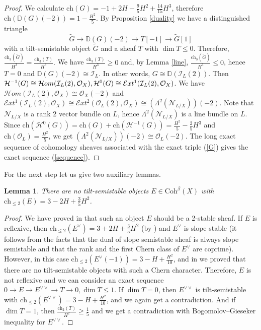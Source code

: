 \documentclass{amsart}
\newtheorem{lemma}[theorem]{Lemma}
\begin{document}
\begin{proof}
	We calculate $\mathrm{ch}(G)=-1+2H-\frac 95H^2+\frac{14}{15}H^3$, therefore $\mathrm{ch}(\mathbb D(G)(-2))=1-\frac{H^2}{5}$. By Proposition \ref{duality} we have a distinguished triangle
	$$\widetilde{G}\to \mathbb D(G)(-2)\to T[-1]\to \widetilde{G}[1]$$
	with a tilt-semistable object $\widetilde{G}$ and a sheaf $T$ with $\dim T\le 0$. Therefore, $\frac{\mathrm{ch}_3(\widetilde G)}{H^3}=\frac{\mathrm{ch}_3(T)}{H^3}.$ We have $\frac{\mathrm{ch}_3(T)}{H^3}\ge 0$ and, by Lemma \ref{line}, $\frac{\mathrm{ch}_3(\widetilde G)}{H^3}\le 0$, hence $T=0$ and $\mathbb D(G)(-2)\cong\mathcal I_L$. 
	In other words, $G\cong\mathbb D(\mathcal I_L(2))$. 
    Then $\mathcal H^{-1}(G)\cong\mathcal Hom(\mathcal I_L(2),\mathcal O_X),\linebreak\mathcal H^0(G)\cong\mathcal Ext^1(\mathcal I_L(2),\mathcal O_X)$. We have $\mathcal Hom(\mathcal I_L(2),\mathcal O_X)\cong\mathcal O_X(-2)$ and \linebreak$\mathcal Ext^1(\mathcal I_L(2),\mathcal O_X)\cong\mathcal Ext^2(\mathcal O_L(2),\mathcal O_X)\cong(\Lambda^2(\mathcal N_{L/X}))(-2)$. Note that $\mathcal N_{L/X}$ is a rank 2 vector bundle on $L$, hence $\Lambda^2(\mathcal N_{L/X})$ is a line bundle on $L$. Since $\mathrm{ch}(\mathcal H^0(G))=\mathrm{ch}(G)+\mathrm{ch}(\mathcal H^{-1}(G))=\frac{H^2}{5}-\frac 25H^3$ and $\mathrm{ch}(\mathcal O_L)=\frac{H^2}{5}$, we get \linebreak$(\Lambda^2(\mathcal N_{L/X}))(-2)\cong\mathcal O_L(-2)$. The long exact sequence of cohomology sheaves associated with the exact triple (\ref{G}) gives the exact sequence (\ref{sequence}).
	\end{proof}
	
	For the next step let us give two auxiliary lemmas.
	
	\begin{lemma}\label{3 -2 3/5}There are no tilt-semistable objects $E\in\mathrm{Coh}^\beta(X)$ with $\mathrm{ch}_{\le 2}(E)=3-2H+\frac 35H^2$.
	\end{lemma}
	
	\begin{proof}We have proved in \cite[Lemma 3.5]{Vass} that such an object $E$ should be a 2-stable sheaf. If $E$ is reflexive, then $\mathrm{ch}_{\le 2}(E^\vee)=3+2H+\frac 35H^2$ (by \cite[Lemma 2.17]{Vass}) and $E^\vee$ is slope stable (it follows from the facts that the dual of slope semistable sheaf is always slope semistable and that the rank and the first Chern class of $E^\vee$ are coprime). However, in this case $\mathrm{ch}_{\le 2}(E^\vee(-1))=3-H+\frac{H^2}{10}$, and in \cite[Corollary 3.11]{Vass} we proved that there are no tilt-semistable objects with such a Chern character. Therefore, $E$ is not reflexive and we can consider an exact sequence $0\to E\to E^{\vee\vee}\to T\to 0,\dim T\le 1$. If $\dim T=0$, then $E^{\vee\vee}$ is tilt-semistable with $\mathrm{ch}_{\le 2}(E^{\vee\vee})=3-H+\frac{H^2}{10}$, and we again get a contradiction. And if $\dim T=1$, then $\frac{\mathrm{ch}_2(T)}{H^2}\ge\frac 15$ and we get a contradiction with Bogomolov--Gieseker inequality for $E^{\vee\vee}$.
	\end{proof}
	
\end{document}
